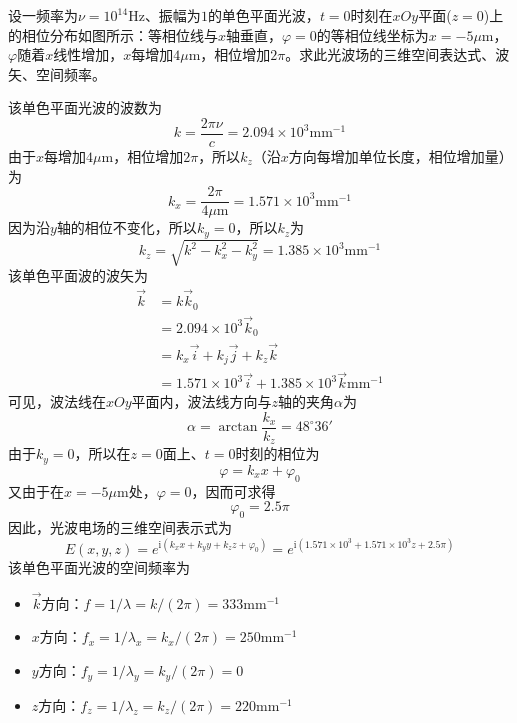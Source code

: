 \documentclass[cn,10pt,chinesefont=founder,math=mtpro2,cite=super,toc=onecol,twoside]{elegantbook}
\begin{document}
\begin{problem}
	设一频率为$\nu=10^{14}\mathrm{Hz}$、振幅为$1$的单色平面光波，$t=0$时刻在$xOy$平面($z=0$)上的相位分布如图所示：等相位线与$x$轴垂直，$\varphi=0$的等相位线坐标为$x=-5\mu\mathrm{m}$，$\varphi$随着$x$线性增加，$x$每增加$4\mu\mathrm{m}$，相位增加$2\pi$。求此光波场的三维空间表达式、波矢、空间频率。
\end{problem}
\begin{solution}
	该单色平面光波的波数为
	\begin{equation}
	k=\frac{2\pi\nu}{c}=2.094\times10^3\mathrm{mm}^{-1}
	\end{equation}
	由于$x$每增加$4\mu\mathrm{m}$，相位增加$2\pi$，所以$k_z$（沿$x$方向每增加单位长度，相位增加量）为
	\begin{equation}
	k_x=\frac{2\pi}{4\mu\mathrm{m}}=1.571\times10^3\mathrm{mm}^{-1}
	\end{equation}
	因为沿$y$轴的相位不变化，所以$k_y=0$，所以$k_z$为
	\begin{equation}
	k_z=\sqrt{k^2-k^2_x-k^2_y}=1.385\times10^3\mathrm{mm}^{-1}
	\end{equation}
	该单色平面波的波矢为
	\begin{equation}
	\begin{aligned}
	\vec{k}&=k\vec{k}_0\\
	&=2.094\times10^3\vec{k}_0\\
	&=k_x\vec{i}+k_j\vec{j}+k_z\vec{k}\\
	&=1.571\times10^3\vec{i}+1.385\times10^3\vec{k}\mathrm{mm}^{-1}
	\end{aligned}
	\end{equation}
	可见，波法线在$xOy$平面内，波法线方向与$z$轴的夹角$\alpha$为
	\begin{equation}
	\alpha=\arctan\frac{k_x}{k_z}=48^{\circ}36'
	\end{equation}
	由于$k_y=0$，所以在$z=0$面上、$t=0$时刻的相位为
	\begin{equation}
	\varphi=k_xx+\varphi_0
	\end{equation}
	又由于在$x=-5\mu\mathrm{m}$处，$\varphi=0$，因而可求得
	\begin{equation}
	\varphi_0=2.5\pi
	\end{equation}
	因此，光波电场的三维空间表示式为
	\begin{equation}
	E(x,y,z)=e^{\mathrm{i}(k_xx+k_yy+k_zz+\varphi_0)}=e^{\mathrm{i}(1.571\times10^3+1.571\times10^3z+2.5\pi)}
	\end{equation}
	该单色平面光波的空间频率为
	\begin{itemize}
		\item $\vec{k}$方向：$f=1/\lambda=k/(2\pi)=333\mathrm{mm}^{-1}$
		\item $x$方向：$f_x=1/\lambda_x=k_x/(2\pi)=250\mathrm{mm}^{-1}$
		\item $y$方向：$f_y=1/\lambda_y=k_y/(2\pi)=0$
		\item $z$方向：$f_z=1/\lambda_z=k_z/(2\pi)=220\mathrm{mm}^{-1}$
	\end{itemize}
\end{solution}
\end{document}
